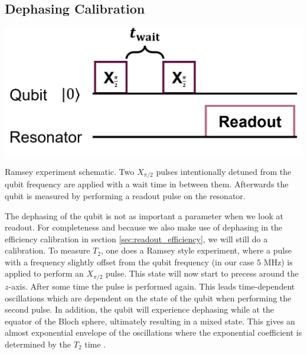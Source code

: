 \subsection{Dephasing Calibration}
\begin{marginfigure}
    \centering
    \includegraphics{Figs/circuits/t2.png}
    \caption{Ramsey experiment schematic. Two $X_{\pi/2}$ pulses intentionally detuned from the qubit frequency are applied with a wait time in between them. Afterwards the qubit is measured by performing a readout pulse on the resonator.}
    \label{fig:enter-label}
\end{marginfigure}
The dephasing of the qubit is not as important a parameter when we look at readout. For completeness and because we also make use of dephasing in the efficiency calibration in section \ref{sec:readout_efficiency}, we will still do a calibration. To measure $T_2$, one does a Ramsey style experiment, where a pulse with a frequency slightly offset from the qubit frequency (in our case $5 \text{ MHz}$) is applied to perform an $X_{\pi/2}$ pulse. This state will now start to precess around the $z$-axis. After some time the pulse is performed again. This leads time-dependent oscillations which are dependent on the state of the qubit when performing the second pulse. In addition, the qubit will experience dephasing while at the equator of the Bloch sphere, ultimately resulting in a mixed state. This gives an almost exponential envelope of the oscillations where the exponential coefficient is determined by the $T_2$ time \cite{krantz_quantum_2019}.

